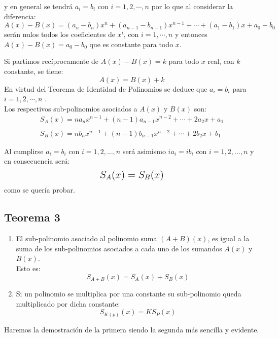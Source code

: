 \documentclass[12pt]{article}
\begin{document}
y en general se tendrá ${a}_i={b}_i$ con $i=1,2,\cdots,n$ por lo que al considerar la diferencia: \\
$$
  A(x)-B(x)=({a}_n - {b}_n)x^n + ({a}_{n-1} - {b}_{n-1})x^{n-1} +\cdots+ ({a}_1-{b}_1)x+{a}_0-{b}_0
$$
serán nulos todos los coeficientes de $x^i$, con $i=1,\cdots,n$ y entonces $A(x)-B(x)={a}_0-{b}_0$ que es constante para todo $x$.

Si partimos recíprocamente de $A(x)-B(x)=k$ para todo $x$ real, con $k$ constante, se tiene:
$$
  A(x)=B(x)+k
$$
En virtud del Teorema de Identidad de Polinomios se deduce que ${a}_i={b}_i$ para $i=1,2,\cdots,n$ .\\
Los respectivos sub-polinomios asociados a $A(x)$ y $B(x)$ son:
$$
  \begin{array}{ccc}
    {S}_A (x)=n{a}_n x^{n-1}+(n-1){a}_{n-1}x^{n-2}+\cdots+2{a}_2 x+{a}_1 \\
    \\
    {S}_B (x)=n{b}_n x^{n-1}+(n-1){b}_{n-1}x^{n-2}+\cdots+2{b}_2 x+{b}_1
  \end{array}
$$

Al cumplirse ${a}_i={b}_i$ con $i=1,2,\dots,n$ será asimismo $i{a}_i=i{b}_i$ con $i=1,2,\dots,n$ y en consecuencia será:
$$
  \text{\Large ${S}_A (x)={S}_B (x)$}
$$
como se quería probar.


\subsection{
  Teorema 3
}
\begin{enumerate}
  \item El sub-polinomio asociado al polinomio suma $(A+B)(x)$, es igual a la suma de los sub-polinomios asociados a cada uno de los sumandos $A(x)$ y $B(x)$. \\
        Esto es:
        $$
          {S}_{A+B}(x)={S}_A(x)+{S}_B(x)
        $$

  \item Si un polinomio se multiplica por una constante su sub-polinomio queda multiplicado por dicha constante:
        $$
          {S}_{K(p)}(x)=K{S}_P(x)
        $$
\end{enumerate}

Haremos la demostración de la primera siendo la segunda más sencilla y evidente.
\end{document}

